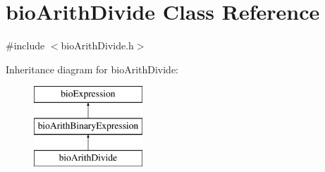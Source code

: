 \hypertarget{classbio_arith_divide}{}\section{bio\+Arith\+Divide Class Reference}
\label{classbio_arith_divide}


{\ttfamily \#include $<$bio\+Arith\+Divide.\+h$>$}

Inheritance diagram for bio\+Arith\+Divide\+:\begin{figure}[H]
\begin{center}
\leavevmode
\includegraphics[height=3.000000cm]{classbio_arith_divide}
\end{center}
\end{figure}
